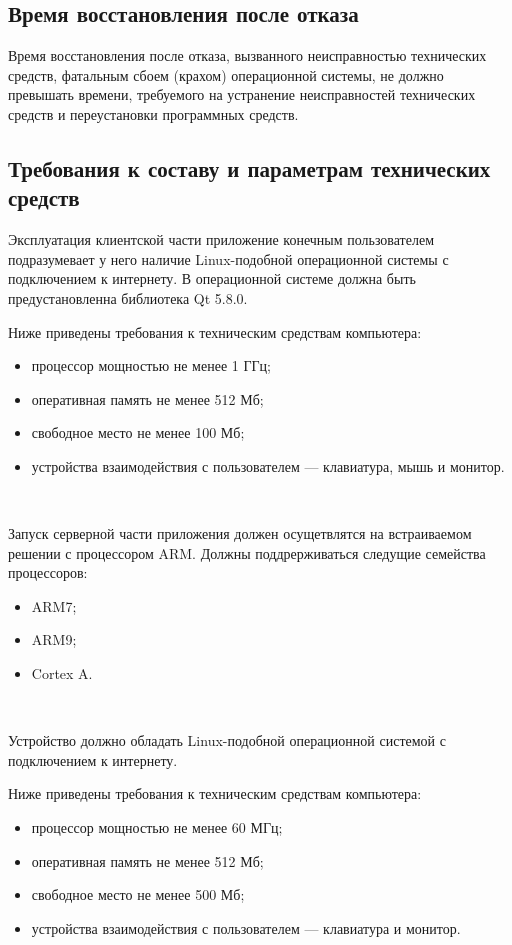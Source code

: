 \documentclass[a4paper,english]{G2-105}
\begin{document}
\subsection{Время восстановления после отказа} \ttl
\par Время восстановления после отказа, вызванного неисправностью технических средств, фатальным сбоем (крахом) операционной системы, не должно превышать времени, требуемого на устранение неисправностей технических средств и переустановки программных средств.
\ttl
\subsection{Требования к составу и параметрам технических средств} \ttl
Эксплуатация клиентской части приложение конечным пользователем подразумевает у него наличие Linux-подобной операционной системы с подключением к интернету. В операционной системе должна быть предустановленна библиотека Qt 5.8.0.
\par Ниже приведены требования к техническим средствам компьютера:
\begin{itemize}
\item процессор мощностью не менее 1 ГГц;
\item оперативная память не менее 512 Мб;
\item свободное место не менее 100 Мб;
\item устройства взаимодействия с пользователем — клавиатура, мышь и
монитор.
\end{itemize}
~\ 
\par Запуск серверной части приложения должен осущетвлятся на встраиваемом решении с процессором ARM. Должны поддрерживаться следущие семейства процессоров:
\begin{itemize}
\item ARM7;
\item ARM9;
\item Cortex A.
\end{itemize}
~\ 
\par Устройство должно обладать Linux-подобной операционной системой с подключением к интернету.
\par Ниже приведены требования к техническим средствам компьютера:
\begin{itemize}
\item процессор мощностью не менее 60 МГц;
\item оперативная память не менее 512 Мб;
\item свободное место не менее 500 Мб;
\item устройства взаимодействия с пользователем — клавиатура и монитор.
\end{itemize}
\ttl
\end{document}

